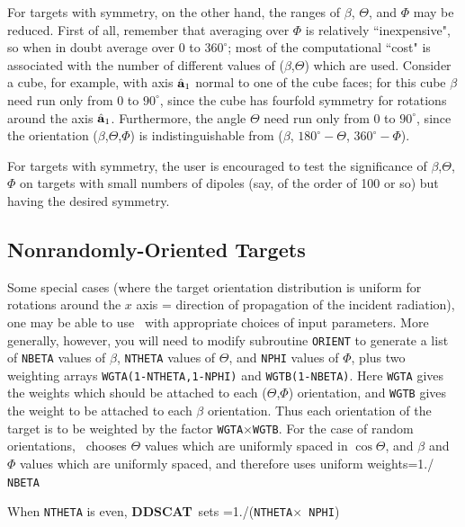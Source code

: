 For targets with symmetry, on the other hand, the ranges of $\beta$,
$\Theta$, and $\Phi$ may be reduced.  First of all, remember that
averaging over $\Phi$ is relatively ``inexpensive", so when in doubt
average over 0 to $360^\circ$; most of the computational ``cost" is
associated with the number of different values of ($\beta$,$\Theta$)
which are used.  Consider a cube, for example, with axis ${\hat{\bf
a}}_1$ normal to one of the cube faces; for this cube $\beta$ need run
only from 0 to $90^\circ$, since the cube has fourfold symmetry for
rotations around the axis ${\hat{\bf a}}_1$.  Furthermore, the angle
$\Theta$ need run only from 0 to $90^\circ$, since the orientation
($\beta$,$\Theta$,$\Phi$) is indistinguishable from ($\beta$,
$180^\circ-\Theta$, $360^\circ-\Phi$).

For targets with symmetry, the user is encouraged to test the
significance of $\beta$,$\Theta$,$\Phi$ on targets with small numbers
of dipoles (say, of the order of 100 or so) but having the desired
symmetry.

\subsection{ Nonrandomly-Oriented Targets}

Some special cases (where the target orientation distribution is
uniform for rotations around the $x$ axis = direction of propagation
of the incident radiation), one may be able to use \ddscatv\ 
with appropriate choices of input parameters.  More generally,
however, you will need to modify subroutine {\tt ORIENT} to generate a
list of {\tt NBETA} values of $\beta$, {\tt NTHETA} values of
$\Theta$, and {\tt NPHI} values of $\Phi$, plus two weighting arrays
{\tt WGTA(1-NTHETA,1-NPHI)} and {\tt WGTB(1-NBETA)}.  Here {\tt WGTA}
gives the weights which should be attached to each ($\Theta$,$\Phi$)
orientation, and {\tt WGTB} gives the weight to be attached to each
$\beta$ orientation.  Thus each orientation of the target is to be
weighted by the factor {\tt WGTA}$\times${\tt WGTB}.  For the case of
random orientations, \ddscat\ chooses $\Theta$ values which
are uniformly spaced in $\cos\Theta$, and $\beta$ and $\Phi$ values
which are uniformly spaced, and therefore uses uniform
weights\hfill\break \indent{}=1./{\tt
NBETA}\hfill\break 

\noindent When {\tt NTHETA} is even, {{\bf DDSCAT}}\ sets\hfill\break
\indent\indent {\tt WGTA}=1./({\tt NTHETA}$\times${\tt
NPHI})\hfill\break 

